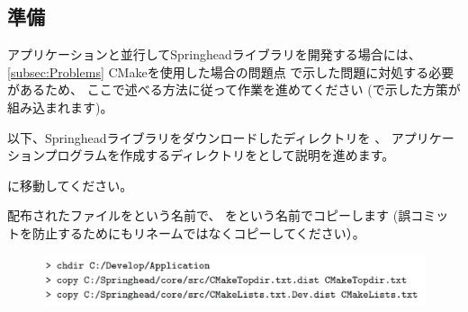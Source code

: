 \subsection{準備}
\label{subsec:PrepareApplication}

\noindent
アプリケーションと並行してSpringheadライブラリを開発する場合には、
\KQuoteS\ref{subsec:Problems} CMakeを使用した場合の問題点\KQuoteE
で示した問題に対処する必要があるため、
ここで述べる方法に従って作業を進めてください
(で示した方策が組み込まれます)。

\medskip
以下、Springheadライブラリをダウンロードしたディレクトリを\SprTop{} 、
アプリケーションプログラムを作成するディレクトリを\AppTop{}として説明を進めます。

\bigskip
\noindent
\AppTop{}に移動してください。

\bigskip
\noindent
配布されたファイルを\CMakeTopdir{}という名前で、
を\CMakeLists{}という名前でコピーします
(誤コミットを防止するためにもリネームではなくコピーしてください）。

\medskip
\ifLwarp
	\begin{figure}[h]
	    \begin{center}
	    \includegraphics[width=\textwidth]{fig/command-3-1-a.eps}
	    \end{center}
	    \label{fig:DownloadTree}
	\end{figure}
\else
\begin{narrow}[15pt]
\end{narrow}
\fi

